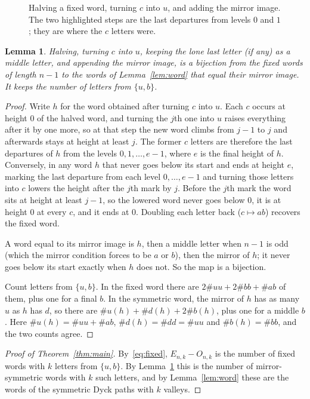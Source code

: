 \documentclass[11pt]{article}
\newtheorem{lemma}{Lemma}
\theoremstyle{remark}
\begin{document}
\begin{figure}[ht]
\centering

\caption{Halving a fixed word, turning $c$ into $u$, and adding the mirror image. The two
highlighted steps are the last departures from levels $0$ and $1$; they are where the $c$ letters
were.}
\label{fig:halve}
\end{figure}

\begin{lemma}\label{lem:halve}
Halving, turning $c$ into $u$, keeping the lone last letter (if any) as a middle letter, and
appending the mirror image, is a bijection from the fixed words of length $n-1$ to the words of
Lemma~\ref{lem:word} that equal their mirror image. It keeps the number of letters from $\{u,b\}$.
\end{lemma}

\begin{proof}
Write $h$ for the word obtained after turning $c$ into $u$. Each $c$ occurs at height $0$ of the
halved word, and turning the $j$th one into $u$ raises everything after it by one more, so at that
step the new word climbs from $j-1$ to $j$ and afterwards stays at height at least $j$. The former
$c$ letters are therefore the last departures of $h$ from the levels $0,1,\dots,e-1$, where $e$ is
the final height of $h$. Conversely, in any word $h$ that never goes below its start and ends at
height $e$, marking the last departure from each level $0,\dots,e-1$ and turning those letters into
$c$ lowers the height after the $j$th mark by $j$. Before the $j$th mark the word sits at height
at least $j-1$, so the lowered word never goes below $0$, it is at height $0$ at every $c$, and it
ends at $0$. Doubling each letter back ($c\mapsto ab$) recovers the fixed word.

A word equal to its mirror image is $h$, then a middle letter when $n-1$ is odd (which the mirror
condition forces to be $a$ or $b$), then the mirror of $h$; it never goes below its start exactly
when $h$ does not. So the map is a bijection.

Count letters from $\{u,b\}$. In the fixed word there are $2\#uu+2\#bb+\#ab$ of them, plus one
for a final $b$. In the symmetric word, the mirror of $h$ has as many $u$ as $h$ has $d$, so there
are $\#u(h)+\#d(h)+2\#b(h)$, plus one for a middle $b$. Here $\#u(h)=\#uu+\#ab$, $\#d(h)=\#dd=\#uu$
and $\#b(h)=\#bb$, and the two counts agree.
\end{proof}

\begin{proof}[Proof of Theorem~\ref{thm:main}]
By~\eqref{eq:fixed}, $E_{n,k}-O_{n,k}$ is the number of fixed words with $k$ letters from $\{u,b\}$.
By Lemma~\ref{lem:halve} this is the number of mirror-symmetric words with $k$ such letters, and by
Lemma~\ref{lem:word} these are the words of the symmetric Dyck paths with $k$ valleys.
\end{proof}
\end{document}
